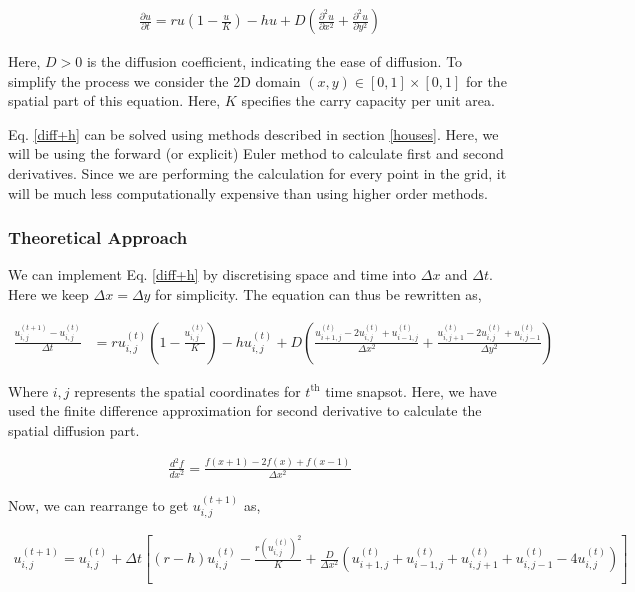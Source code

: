\begin{align} \label{diff+h}
    \frac{\partial u}{\partial t} = ru\left(1-\frac{u}{K}\right) - hu + D\left(\frac{\partial^2 u}{\partial x^2} + \frac{\partial^2 u}{\partial y^2}\right)
\end{align}

Here, $D > 0$ is the diffusion coefficient, indicating the ease of diffusion. To simplify the process we consider the 2D domain $(x, y) \in [0,1] \times [0,1]$ for the spatial part of this equation. Here, $K$ specifies the carry capacity per unit area.

Eq. \ref{diff+h} can be solved using methods described in section \ref{houses}. Here, we will be using the forward (or explicit) Euler method to calculate first and second derivatives. Since we are performing the calculation for every point in the grid, it will be much less computationally expensive than using higher order methods.

\subsubsection{Theoretical Approach}
We can implement Eq. \ref{diff+h} by discretising space and time into $\Delta x$ and $\Delta t$. Here we keep $\Delta x = \Delta y$ for simplicity. The equation can thus be rewritten as,

\begin{align}
    \frac{u_{i,j}^{(t+1)} - u_{i,j}^{(t)}}{\Delta t}  &= ru_{i,j}^{(t)} \left(1 - \frac{u_{i,j}^{(t)}}{K} \right) - hu_{i,j}^{(t)} + D \left( \frac{u_{i+1,j}^{(t)} -2u_{i,j}^{(t)} + u_{i-1,j}^{(t)}}{\Delta x^2} + \frac{u_{i,j+1}^{(t)} -2u_{i,j}^{(t)} + u_{i,j-1}^{(t)}}{\Delta y^2}\right)
\end{align}

Where $i,j$ represents the spatial coordinates for $t^\text{th}$ time snapsot. Here, we have used the finite difference approximation for second derivative to calculate the spatial diffusion part.

\begin{align}
    \frac{d^2f}{dx^2} = \frac{f(x+1) -2f(x) + f(x-1)}{\Delta x^2}
\end{align}

Now, we can rearrange to get $u_{i,j}^{(t+1)}$ as,

\begin{align}
    u_{i,j}^{(t+1)} = u_{i,j}^{(t)} + \Delta t\left[(r-h)u_{i,j}^{(t)} - \frac{r(u_{i,j}^{(t)})^2}{K} + \frac{D}{\Delta x^2} \left( u_{i+1,j}^{(t)} + u_{i-1,j}^{(t)} +  u_{i,j+1}^{(t)} + u_{i,j-1}^{(t)}  -4u_{i,j}^{(t)} \right)\right]
\end{align}

